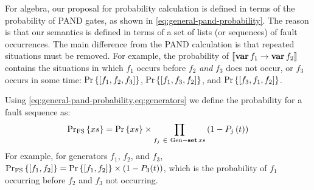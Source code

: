 For \ac{algebra}, our proposal for probability calculation is defined in terms of the probability of \ac{PAND} gates, as shown in \cref{eq:general-pand-probability}.
The reason is that our semantics is defined in terms of a set of lists (or sequences) of fault occurrences.
The main difference from the \ac{PAND} calculation is that repeated situations must be removed.
For example, the probability of $\left[\!\left[\operatorname{\mathbf{var}} f_1 \rightarrow \operatorname{\mathbf{var}} f_2\right]\!\right]$ contains the situations in which $f_1$ occurs before $f_2$ \emph{and} $f_3$ does not occur, or $f_3$ occurs in some time: $\Pr\left\{\left[f_1,f_2,f_3\right]\right\}$, $\Pr\left\{\left[f_1,f_3,f_2\right]\right\}$, and $\Pr\left\{\left[f_3,f_1,f_2\right]\right\}$.
%
%
%

Using \cref{eq:general-pand-probability,eq:generators} we define the probability for a fault sequence as:
%
\begin{equation}
\mathrm{Pr_{FS}}\left\{xs\right\} = 
  \Pr\left\{xs\right\} \times \prod_{f_j ~\in~ \mathrm{Gen} - \operatorname{\mathbf{set}} xs} \left(1-P_j\left(t\right)\right)\label{eq:denotational-probability}
\end{equation}
%
%
For example, for generators $f_1$, $f_2$, and $f_3$, $\mathrm{Pr_{FS}}\left\{\left[f_1,f_2\right]\right\} = \Pr\left\{\left[f_1,f_2\right]\right\}\times\left(1-P_3(t)\right)$, which is the probability of $f_1$ occurring before $f_2$ and $f_3$ not occurring.

